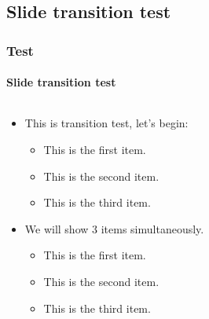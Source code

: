 \documentclass[aspectratio=169,hyperref={implicit=true}]{beamer}
\begin{document}
\subsection{Slide transition test}

\begin{frame}

\frametitle{Test}
\framesubtitle{Slide transition test}
\label{sec:slidetrans}

\begin{columns}
  \begin{column}{.48\textwidth}
    \begin{itemize}
      \item<1-> This is transition test, let's begin:
      \begin{itemize}
        \item<2-> This is the first item.
        \item<3-> This is the second item.
        \item<4-> This is the third item.
      \end{itemize}
      \item<5-> We will show 3 items simultaneously.
      \begin{itemize}
        \item<6-> This is the first item.
        \item<6-> This is the second item.
        \item<6-> This is the third item.
      \end{itemize}
    \end{itemize}
  \end{column}
  \begin{column}{.48\textwidth}
  \end{column}
\end{columns}

\end{frame}

\end{document}
